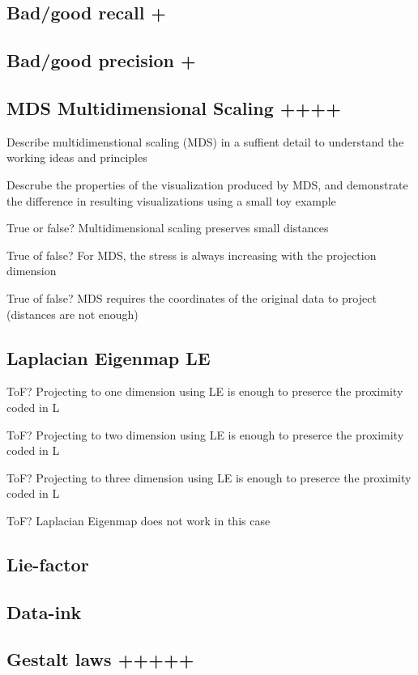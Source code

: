\documentclass[a4paper]{article}
\begin{document}
\subsection{Bad/good recall +}

\subsection{Bad/good precision +}

\subsection{MDS Multidimensional Scaling ++++}

Describe multidimenstional scaling (MDS) in a suffient detail to understand the working ideas and principles

Descrube the properties of the visualization produced by MDS, and demonstrate the difference in resulting visualizations using a small toy example

True or false? Multidimensional scaling preserves small distances

True of false? For MDS, the stress is always increasing with the projection dimension

True of false? MDS requires the coordinates of the original data to project (distances are not enough)

\subsection{Laplacian Eigenmap LE}

ToF? Projecting to one dimension using LE is enough to preserce the proximity coded in L

ToF? Projecting to two dimension using LE is enough to preserce the proximity coded in L

ToF? Projecting to three dimension using LE is enough to preserce the proximity coded in L

ToF? Laplacian Eigenmap does not work in this case

\subsection{Lie-factor}

\subsection{Data-ink}

\subsection{Gestalt laws +++++}
\end{document}
